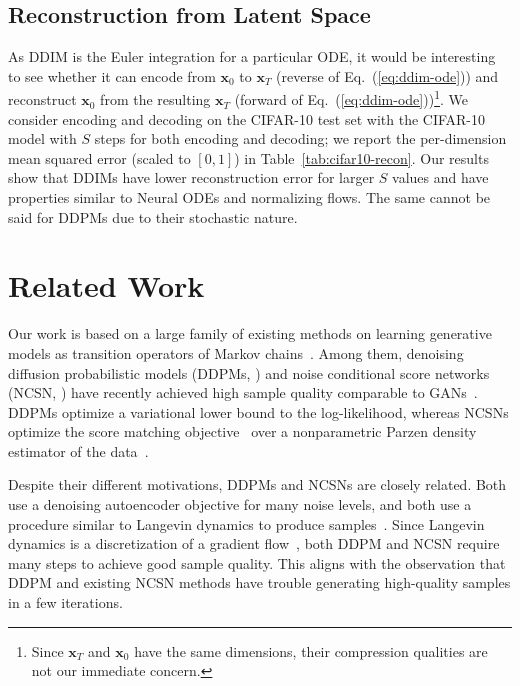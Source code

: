\subsection{Reconstruction from Latent Space} As DDIM is the Euler integration for a particular ODE, it would be interesting to see whether it can encode from ${\bm{x}}_0$ to ${\bm{x}}_T$ (reverse of Eq.~(\ref{eq:ddim-ode})) and reconstruct ${\bm{x}}_0$ from the resulting ${\bm{x}}_T$ (forward of Eq.~(\ref{eq:ddim-ode}))\footnote{Since ${\bm{x}}_T$ and ${\bm{x}}_0$ have the same dimensions, their compression qualities are not our immediate concern.}. We consider encoding and decoding on the CIFAR-10 test set with the CIFAR-10 model with $S$ steps for both encoding and decoding; we report the per-dimension mean squared error (scaled to $[0, 1]$) in Table~\ref{tab:cifar10-recon}. Our results show that DDIMs have lower reconstruction error for larger $S$ values and have properties similar to Neural ODEs and normalizing flows. The same cannot be said for DDPMs due to their stochastic nature.

\section{Related Work} Our work is based on a large family of existing methods on learning generative models as transition operators of Markov chains~\citep{sohl-dickstein2015deep,bengio2014deep,salimans2014markov,song2017a,goyal2017variational,levy2017generalizing}. Among them, denoising diffusion probabilistic models (DDPMs, \citet{ho2020denoising}) and noise conditional score networks (NCSN, \citet{song2019generative,song2020improved}) have recently achieved high sample quality comparable to GANs~\citep{brock2018large,karras2018a}. DDPMs optimize a variational lower bound to the log-likelihood, whereas NCSNs optimize the score matching objective~\citep{h2005estimation} over a nonparametric Parzen density estimator of the data~\citep{vincent2011connection,raphan2011least}. 

Despite their different motivations, DDPMs and NCSNs are closely related. Both use a denoising autoencoder objective for many noise levels, and both use a procedure similar to Langevin dynamics to produce samples~\citep{neal2011mcmc}. Since Langevin dynamics is a discretization of a gradient flow~\citep{jordan1998variational}, both DDPM and NCSN require many steps to achieve good sample quality. This aligns with the observation that DDPM and existing NCSN methods have trouble generating high-quality samples in a few iterations.

